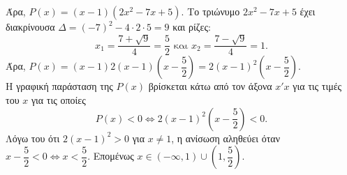 \begin{alist}
\begin{center}
\end{center}
Άρα, $P(x) = (x-1)(2x^2 - 7x + 5)$. Το τριώνυμο $2x^2 - 7x + 5$ έχει διακρίνουσα $\Delta = (-7)^2 - 4 \cdot 2 \cdot 5 = 9$ και ρίζες:
\[x_1 = \frac{7+\sqrt{9}}{4} = \frac{5}{2} \text{ και } x_2 = \frac{7-\sqrt{9}}{4} = 1.\]
Άρα, $P(x) = (x-1)2(x-1)\left(x-\dfrac{5}{2}\right) = 2(x-1)^2\left(x-\dfrac{5}{2}\right)$. \\
Η γραφική παράσταση της $P(x)$ βρίσκεται κάτω από τον άξονα $x'x$ για τις τιμές του $x$ για τις οποίες
\[P(x) < 0 \Leftrightarrow 2(x-1)^2\left(x-\frac{5}{2}\right) < 0.\]
Λόγω του ότι $2(x-1)^2 > 0$ για $x \ne 1$, η ανίσωση αληθεύει όταν $x-\dfrac{5}{2} < 0 \Leftrightarrow x < \dfrac{5}{2}$. Επομένως $x \in (-\infty, 1) \cup \left(1, \dfrac{5}{2}\right)$.
\end{alist}

